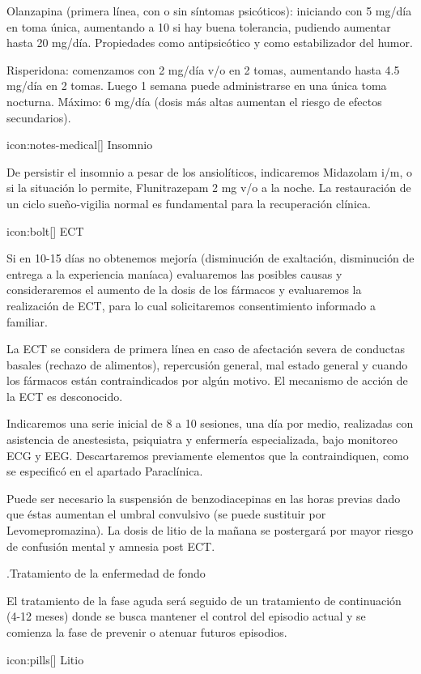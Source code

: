 \documentclass[encares.tex]{subfiles}
\begin{document}
Olanzapina (primera línea, con o sin síntomas psicóticos): iniciando con 5 mg/día en toma única, aumentando a 10 si hay buena tolerancia, pudiendo aumentar hasta 20 mg/día. Propiedades como antipsicótico y como estabilizador del humor.

Risperidona: comenzamos con 2 mg/día v/o en 2 tomas, aumentando hasta 4.5 mg/día en 2 tomas. Luego 1 semana puede administrarse en una única toma nocturna. Máximo: 6 mg/día (dosis más altas aumentan el riesgo de efectos secundarios).

icon:notes-medical[] Insomnio

De persistir el insomnio a pesar de los ansiolíticos, indicaremos Midazolam i/m, o si la situación lo permite, Flunitrazepam 2 mg v/o a la noche. La restauración de un ciclo sueño-vigilia normal es fundamental para la recuperación clínica.

icon:bolt[] ECT

Si en 10-15 días no obtenemos mejoría (disminución de exaltación, disminución de entrega a la experiencia maníaca) evaluaremos las posibles causas y consideraremos el aumento de la dosis de los fármacos y evaluaremos la realización de ECT, para lo cual solicitaremos consentimiento informado a familiar.

La ECT se considera de primera línea en caso de afectación severa de conductas basales (rechazo de alimentos), repercusión general, mal estado general y cuando los fármacos están contraindicados por algún motivo. El mecanismo de acción de la ECT es desconocido.

Indicaremos una serie inicial de 8 a 10 sesiones, una día por medio, realizadas con asistencia de anestesista, psiquiatra y enfermería especializada, bajo monitoreo ECG y EEG. Descartaremos previamente elementos que la contraindiquen, como se especificó en el apartado Paraclínica.

Puede ser necesario la suspensión de benzodiacepinas en las horas previas dado que éstas aumentan el umbral convulsivo (se puede sustituir por Levomepromazina). La dosis de litio de la mañana se postergará por mayor riesgo de confusión mental y amnesia post ECT.

.Tratamiento de la enfermedad de fondo

El tratamiento de la fase aguda será seguido de un tratamiento de continuación (4-12 meses) donde se busca mantener el control del episodio actual y se comienza la fase de prevenir o atenuar futuros episodios.

icon:pills[] Litio
\end{document}
